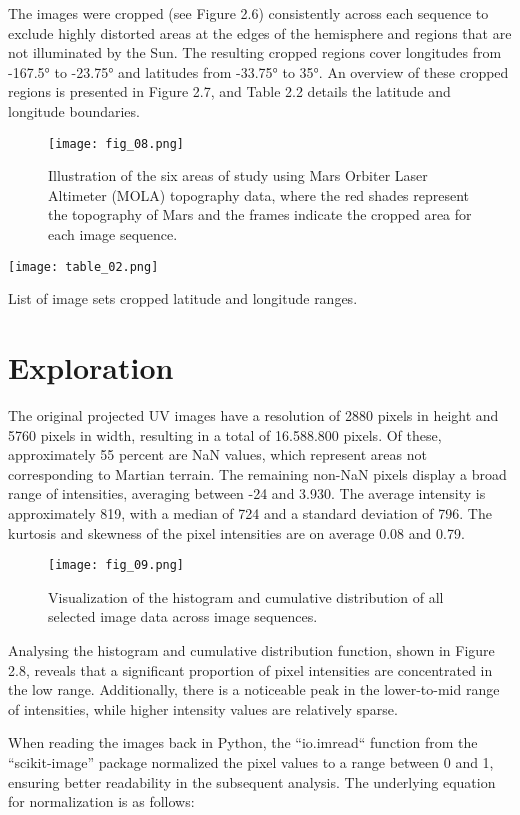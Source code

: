 \FloatBarrier
The images were cropped (see Figure 2.6) consistently across each sequence to exclude highly distorted areas at the edges of the hemisphere and regions that are not illuminated by the Sun. 
The resulting cropped regions cover longitudes from -167.5° to -23.75° and latitudes from -33.75° to 35°. An overview of these cropped regions is presented in Figure 2.7, and Table 2.2 details the latitude and longitude boundaries.
\FloatBarrier
\begin{figure}[h!] 
    \centering
    \texttt{[image: fig\_08.png]}
    \caption{Illustration of the six areas of study using Mars Orbiter Laser Altimeter (MOLA) topography data\cite{MOLA}, where the red shades represent the topography of Mars and the frames indicate the cropped area for each image sequence.}
\end{figure}
\FloatBarrier
\begin{table}[h!]
    \centering
    \texttt{[image: table\_02.png]}
    \caption{ List of image sets cropped latitude and longitude ranges.}
\end{table}
\FloatBarrier
\section{Exploration}

The original projected UV images have a resolution of 2880 pixels in height and 5760 pixels in width, resulting in a total of 16.588.800 pixels. Of these, approximately 55 percent are NaN values, which represent areas not corresponding to Martian terrain. The remaining non-NaN pixels display a broad range of intensities, averaging between -24 and 3.930. The average intensity is approximately 819, with a median of 724 and a standard deviation of 796. The kurtosis and skewness of the pixel intensities are on average 0.08 and 0.79.
\FloatBarrier
\begin{figure}[h!] 
    \centering
    \texttt{[image: fig\_09.png]}
    \caption{Visualization of the histogram and cumulative distribution of all selected image data across image sequences.}
\end{figure}
\FloatBarrier
Analysing the histogram and cumulative distribution function, shown in Figure 2.8, reveals that a significant proportion of pixel intensities are concentrated in the low range. Additionally, there is a noticeable peak in the lower-to-mid range of intensities, while higher intensity values are relatively sparse.

When reading the images back in Python, the “io.imread“ function from the “scikit-image” package normalized the pixel values to a range between 0 and 1, ensuring better readability in the subsequent analysis. The underlying equation for normalization is as follows:

